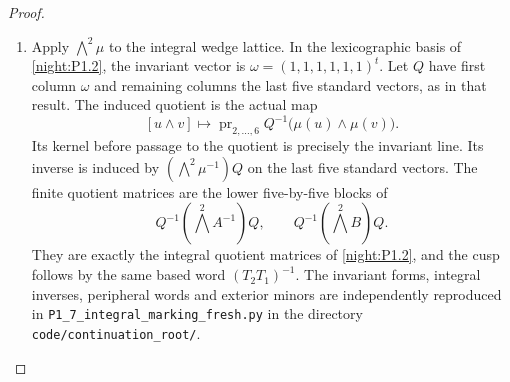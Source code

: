 \begin{proof}
\begin{enumerate}[label=\arabic*.]
\item Apply $\bigwedge^2\mu$ to the integral wedge lattice. In the
lexicographic basis of \cref{night:P1.2}, the invariant vector is
$\omega=(1,1,1,1,1,1)^t$. Let $Q$ have first column $\omega$ and
remaining columns the last five standard vectors, as in that result.
The induced quotient is the actual map
\[
 [u\wedge v]\longmapsto
 \operatorname{pr}_{2,\ldots,6}
 Q^{-1}\bigl(\mu(u)\wedge\mu(v)\bigr).
\]
Its kernel before passage to the quotient is precisely the invariant
line. Its inverse is induced by $(\bigwedge^2\mu^{-1})Q$ on the last
five standard vectors. The finite quotient matrices are the lower
five-by-five blocks of
\[
 Q^{-1}(\bigwedge^2 A^{-1})Q,\qquad
 Q^{-1}(\bigwedge^2 B)Q.
\]
They are exactly the integral quotient matrices of
\cref{night:P1.2}, and the cusp follows by the same based word
$(T_2T_1)^{-1}$. The invariant forms, integral inverses, peripheral
words and exterior minors are independently reproduced in
\texttt{P1\_7\_integral\_marking\_fresh.py} in the directory 
\texttt{code/continuation\_root/}.
\end{enumerate}
\end{proof}




